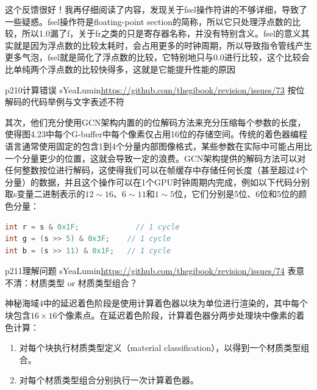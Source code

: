\begin{myshaded}
	这个反馈很好！我再仔细阅读了内容，发现关于fsel操作符讲的不够详细，导致了一些疑惑。fsel操作符是floating-point section的简称，所以它只处理浮点数的比较，所以1.0漏了f，关于fr之类的只是寄存器名称，并没有特别含义。fsel的意义其实就是因为浮点数的比较太耗时，会占用更多的时钟周期，所以导致指令管线产生更多气泡，fsel就是简化了浮点数的比较，它特别地只与0.0进行比较，这个比较会比单纯两个浮点数的比较快得多，这就是它能提升性能的原因
\end{myshaded}




\begin{revision}{p210}{计算错误}{	sYeaLumin}{\url{https://github.com/thegibook/revision/issues/73}}
	按位解码的代码举例与文字表述不符
\end{revision}
其次，他们充分使用GCN架构内置的的位解码方法来充分压缩每个参数的长度，使得图4.23中每个G-buffer中每个像素仅占用16位的存储空间。传统的着色器编程语言通常使用固定的包含1到4个分量内部图像格式，某些参数在实际中可能占用比一个分量更少的位置，这就会导致一定的浪费。GCN架构提供的解码方法\cite{a:Low-levelShaderOptimizationforNext-GenandDX11}可以对任何整数按位进行解码，这使得我们可以在帧缓存中存储任何长度（甚至超过4个分量）的数据，并且这个操作可以在1个GPU时钟周期内完成，例如以下代码分别取s变量二进制表示的$12\sim 16$、$6 \sim 11$和$1\sim 5$位，它们分别是5位、6位和5位的颜色分量：

\begin{lstlisting}[language=C++]
int r = s & 0x1F; 			  // 1 cycle
int g = (s >> 5) & 0x3F;	// 1 cycle
int b = (s >> 11) & 0x1F;	// 1 cycle
\end{lstlisting}



\begin{revision}{p211}{理解问题}{	sYeaLumin}{\url{https://github.com/thegibook/revision/issues/74}}
	表意不清：材质类型 or 材质类型组合？
\end{revision}

神秘海域4中的延迟着色阶段是使用计算着色器以块为单位进行渲染的，其中每个块包含$16\times 16$个像素点。在延迟着色阶段，计算着色器分两步处理块中像素的着色计算：
\begin{enumerate}
	\item 对每个块执行材质类型定义（material classification），以得到一个材质类型组合。
	\item 对每个材质类型组合分别执行一次计算着色器。
\end{enumerate}




